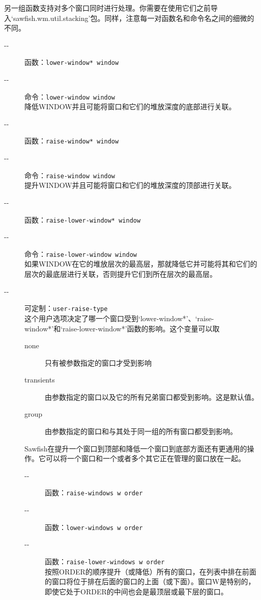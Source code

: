\documentclass{book}
\begin{document}
\begin{CJK*}{UTF8}{gbsn}
另一组函数支持对多个窗口同时进行处理。你需要在使用它们之前导入`sawfish.wm.util.stacking'包。同样，注意每一对函数名和命令名之间的细微的不同。
\begin{description}
\item[-{}-] 函数：\verb|lower-window* window|\\
\item[-{}-] 命令：\verb|lower-window window|\\
降低WINDOW并且可能将窗口和它们的堆放深度的底部进行关联。
\item[-{}-] 函数：\verb|raise-window* window|\\
\item[-{}-] 命令：\verb|raise-window window|\\
提升WINDOW并且可能将窗口和它们的堆放深度的顶部进行关联。
\item[-{}-] 函数：\verb|raise-lower-window* window|\\
\item[-{}-] 命令：\verb|raise-lower-window window|\\
如果WINDOW在它的堆放层次的最高层，那就降低它并可能将其和它们的层次的最底层进行关联，否则提升它们到所在层次的最高层。
\item[-{}-] 可定制：\verb|user-raise-type|\\
这个用户选项决定了哪一个窗口受到`lower-window*'、`raise-window*'和`raise-lower-window*'函数的影响。这个变量可以取
\begin{description}
\item[none] 只有被参数指定的窗口才受到影响
\item[transients] 由参数指定的窗口以及它的所有兄弟窗口都受到影响。这是默认值。
\item[group] 由参数指定的窗口和与其处于同一组的所有窗口都受到影响。
\end{description}

Sawfish在提升一个窗口到顶部和降低一个窗口到底部方面还有更通用的操作。它可以将一个窗口和一个或者多个其它正在管理的窗口放在一起。
\begin{description}
\item[-{}-] 函数：\verb|raise-windows w order|\\
\item[-{}-] 函数：\verb|lower-windows w order|\\
\item[-{}-] 函数：\verb|raise-lower-windows w order|\\
按照ORDER的顺序提升（或降低）所有的窗口，在列表中排在前面的窗口将位于排在后面的窗口的上面（或下面）。窗口W是特别的，即使它处于ORDER的中间也会是最顶层或最下层的窗口。


\end{description}
\end{description}
\end{CJK*}
\end{document}
